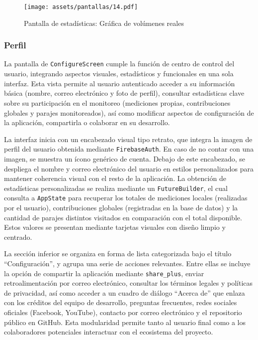 \begin{figure}[h!]
\centering
  \texttt{[image: assets/pantallas/14.pdf]}
  \caption{Pantalla de estadísticas: Gráfica de volúmenes reales }
  \label{pantallas14}
\end{figure}

\newpage
\subsubsection{Perfil} 

La pantalla de \texttt{ConfigureScreen} cumple la función de centro de control del usuario, integrando aspectos visuales, estadísticos y funcionales en una sola interfaz. Esta vista permite al usuario autenticado acceder a su información básica (nombre, correo electrónico y foto de perfil), consultar estadísticas clave sobre su participación en el monitoreo (mediciones propias, contribuciones globales y parajes monitoreados), así como modificar aspectos de configuración de la aplicación, compartirla o colaborar en su desarrollo.

La interfaz inicia con un encabezado visual tipo retrato, que integra la imagen de perfil del usuario obtenida mediante \texttt{FirebaseAuth}. En caso de no contar con una imagen, se muestra un ícono genérico de cuenta. Debajo de este encabezado, se despliega el nombre y correo electrónico del usuario en estilos personalizados para mantener coherencia visual con el resto de la aplicación. La obtención de estadísticas personalizadas se realiza mediante un \texttt{FutureBuilder}, el cual consulta a \texttt{AppState} para recuperar los totales de mediciones locales (realizadas por el usuario), contribuciones globales (registradas en la base de datos) y la cantidad de parajes distintos visitados en comparación con el total disponible. Estos valores se presentan mediante tarjetas visuales con diseño limpio y centrado.

La sección inferior se organiza en forma de lista categorizada bajo el título ``Configuración'', y agrupa una serie de acciones relevantes. Entre ellas se incluye la opción de compartir la aplicación mediante \texttt{share\_plus}, enviar retroalimentación por correo electrónico, consultar los términos legales y políticas de privacidad, así como acceder a un cuadro de diálogo “Acerca de” que enlaza con los créditos del equipo de desarrollo, preguntas frecuentes, redes sociales oficiales (Facebook, YouTube), contacto por correo electrónico y el repositorio público en GitHub. Esta modularidad permite tanto al usuario final como a los colaboradores potenciales interactuar con el ecosistema del proyecto.

